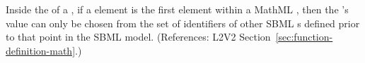 Inside the  of a \FunctionDefinition, if a  element
is the first element within a MathML , then the 's
value can only be chosen from the set of identifiers of other SBML
\FunctionDefinition{}s defined prior to that point in the SBML model.
(References: L2V2 Section~\ref{sec:function-definition-math}.)
